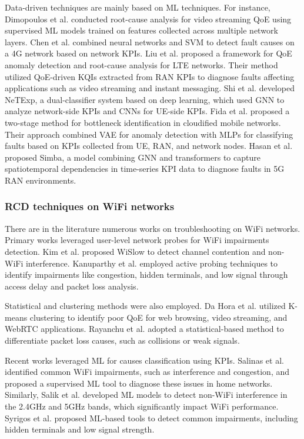 Data-driven techniques are mainly based on ML techniques. For instance, Dimopoulos et al. \cite{dimopoulos2015identifying} conducted root-cause analysis for video streaming QoE using supervised ML models trained on features collected across multiple network layers.
Chen et al. \cite{chen2019machine} combined neural networks and SVM to detect fault causes on a 4G network based on network KPIs.
Liu et al. \cite{liu2019kqis} proposed a framework for QoE anomaly detection and root-cause analysis for LTE networks. Their method utilized QoE-driven  \ac{KQIs} extracted from RAN KPIs to diagnose faults affecting applications such as video streaming and instant messaging. 
Shi et al. \cite{shi2022towards} developed NeTExp, a dual-classifier system based on deep learning, which used \ac{GNN} to analyze network-side KPIs and CNNs for UE-side KPIs.
Fida et al. \cite{fida2023bottleneck} proposed a two-stage method for bottleneck identification in cloudified mobile networks. Their approach combined VAE for anomaly detection with MLPs for classifying faults based on KPIs collected from UE, RAN, and network nodes. 
Hasan et al. \cite{hasan2024root} proposed Simba, a model combining \ac{GNN} and transformers to capture spatiotemporal dependencies in time-series KPI data to diagnose faults in 5G RAN environments. 
 

\subsubsection{RCD techniques on WiFi networks}


There are in the literature numerous works on troubleshooting on WiFi networks.
Primary works leveraged user-level network probes for WiFi impairments detection. Kim et al. \cite{kim2014wislow} proposed WiSlow to detect channel contention and non-WiFi interference. Kanuparthy et al. \cite{kanuparthy2012can} employed active probing techniques to identify impairments like congestion, hidden terminals, and low signal through access delay and packet loss analysis.

Statistical and clustering methods were also employed. Da Hora et al. \cite{da2018predicting} utilized K-means clustering to identify poor \ac{QoE} for web browsing, video streaming, and WebRTC applications. Rayanchu et al. \cite{rayanchu2008diagnosing} adopted a statistical-based method to differentiate packet loss causes, such as collisions or weak signals.

Recent works leveraged ML for causes classification using KPIs. Salinas et al. \cite{salinas2018home} identified common WiFi impairments, such as interference and congestion, and proposed a supervised ML tool to diagnose these issues in home networks. Similarly, Salik et al. \cite{salik2023non} developed ML models to detect non-WiFi interference in the 2.4GHz and 5GHz bands, which significantly impact WiFi performance. Syrigos et al. \cite{syrigos2019employment} proposed ML-based tools to detect common impairments, including hidden terminals and low signal strength.


